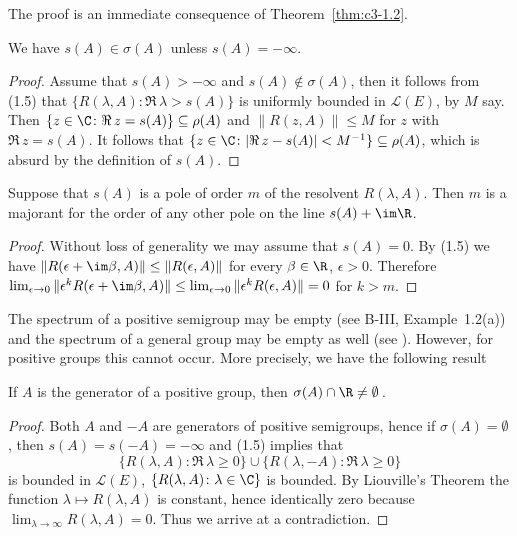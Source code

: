 The proof is an immediate consequence of Theorem~\ref{thm:c3-1.2}.

\begin{corollary}\label{cor:c3-1.4}
We have $s(A) \in \sigma(A)$ unless $s(A) = -\infty$.
\end{corollary}

\begin{proof}
Assume that $s(A) > -\infty$ and $s(A) \notin \sigma(A)$, then it follows from (1.5) that $\{R(\lambda,A) \colon \Re\,\lambda > s(A)\}$ is uniformly bounded in $\mathcal{L}(E)$,
%
by $M$ say. Then $\{z \in \C  \colon \Re\, z = s(A)\} \subseteq \rho(A)$ and $\|R(z,A)\| \leq M$ for $z$ with $\Re\, z = s(A)$. It follows that $\{z \in \C  \colon |\Re\, z - s(A)| < M^{-1}\} \subseteq \rho(A)$, which is absurd by the definition of $s(A)$.
\end{proof}

\begin{corollary}\label{cor:c3-1.5}
Suppose that $s(A)$ is a pole of order $m$ of the resolvent $R(\lambda,A)$.
Then $m$ is a majorant for the order of any other pole on the line $s(A) + \im\R $.
\end{corollary}

\begin{proof}
Without loss of generality we may assume that $s(A) = 0$.
By (1.5) we have $\|R(\epsilon+\im\beta ,A)\| \leq \|R(\epsilon,A)\|$ for every $\beta \in \R $, $\epsilon > 0$.
Therefore $\lim_{\epsilon\to 0}\|\epsilon^k R(\epsilon+\im\beta ,A)\| \leq \lim_{\epsilon\to 0}\|\epsilon^k R(\epsilon,A)\| = 0$ for $k > m$.
\end{proof}

The spectrum of a positive semigroup may be empty (see B-III, Example~1.2(a)) and the spectrum of a general group may be empty as well (see \citet[Section~23.16]{hillephillips:1957}).
However, for positive groups this cannot occur.
More precisely, we have the following result
\begin{corollary}\label{cor:c3-1.6}
If $A$ is the generator of a positive group, then $\sigma(A)\cap\R  \neq \emptyset$\,.
\end{corollary}

\begin{proof}
Both $A$ and $-A$ are generators of positive semigroups, hence if $\sigma(A) = \emptyset$, then $s(A) = s(-A) = -\infty$ and (1.5) implies that 
\[
\{R(\lambda,A) \colon \Re\, \lambda \geq 0\} \cup \{R(\lambda,-A) \colon \Re\, \lambda \geq 0\}
\]
is bounded in $\mathcal{L}(E)$, \ie  $\{R(\lambda,A) \colon \lambda \in \C \}$ is bounded.
By Liouville's Theorem the function $\lambda \mapsto R(\lambda,A)$ is constant, hence identically zero because $\lim_{\lambda\to\infty}R(\lambda,A) = 0$.
Thus we arrive at a contradiction.
\end{proof}

